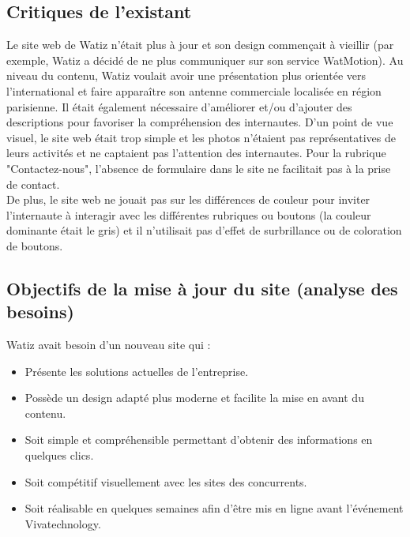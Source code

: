 \documentclass[a4paper, 12pt]{report}
\begin{document}
\subsection{Critiques de l’existant}
Le site web de Watiz n'était plus à jour et son design commençait à vieillir (par exemple, Watiz a décidé de ne plus communiquer sur son service WatMotion). 
Au niveau du contenu, Watiz voulait avoir une présentation plus orientée vers l'international et faire apparaître son antenne commerciale localisée en région parisienne. Il était également nécessaire d'améliorer et/ou d'ajouter des descriptions pour favoriser la compréhension des internautes. 
D'un point de vue visuel, le site web était trop simple et les photos n'étaient pas représentatives de leurs activités et ne captaient pas l'attention des internautes.
Pour la rubrique "Contactez-nous", l'absence de formulaire dans le site ne facilitait pas à la prise de contact.\\

\newpage
De plus, le site web ne jouait pas sur les différences de couleur pour inviter l'internaute à interagir avec les différentes rubriques ou boutons (la couleur dominante était le gris) et il n'utilisait pas d'effet de surbrillance ou de coloration de boutons.
\subsection{Objectifs de la mise à jour du site (analyse des besoins)}
Watiz avait besoin d’un nouveau site qui :
\begin{itemize}
\item \textbf{} Présente les solutions actuelles de l'entreprise.
\item \textbf{} Possède un design adapté plus moderne et facilite la mise en avant du contenu. 
\item \textbf{} Soit simple et compréhensible permettant d'obtenir des informations en quelques clics.
\item \textbf{} Soit compétitif visuellement avec les sites des concurrents. 
\item \textbf{} Soit réalisable en quelques semaines afin d'être mis en ligne avant l'événement Vivatechnology.
\end{itemize} 
\end{document}
